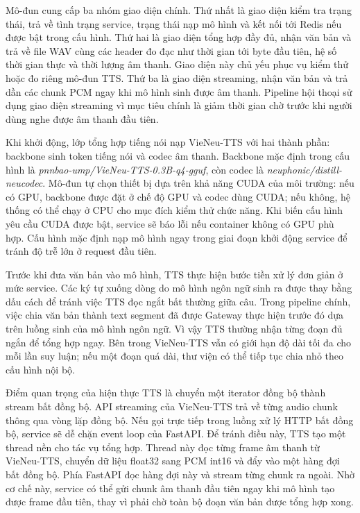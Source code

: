 \documentclass[a4paper,13pt,twoside]{report}
\begin{document}
Mô-đun cung cấp ba nhóm giao diện chính. Thứ nhất là giao diện kiểm tra trạng thái, trả về tình trạng service, trạng thái nạp mô hình và kết nối tới Redis nếu được bật trong cấu hình. Thứ hai là giao diện tổng hợp đầy đủ, nhận văn bản và trả về file WAV cùng các header đo đạc như thời gian tới byte đầu tiên, hệ số thời gian thực và thời lượng âm thanh. Giao diện này chủ yếu phục vụ kiểm thử hoặc đo riêng mô-đun TTS. Thứ ba là giao diện streaming, nhận văn bản và trả dần các chunk PCM ngay khi mô hình sinh được âm thanh. Pipeline hội thoại sử dụng giao diện streaming vì mục tiêu chính là giảm thời gian chờ trước khi người dùng nghe được âm thanh đầu tiên.

Khi khởi động, lớp tổng hợp tiếng nói nạp VieNeu-TTS với hai thành phần: backbone sinh token tiếng nói và codec âm thanh. Backbone mặc định trong cấu hình là \textit{pnnbao-ump/VieNeu-TTS-0.3B-q4-gguf}, còn codec là \textit{neuphonic/distill-neucodec}. Mô-đun tự chọn thiết bị dựa trên khả năng CUDA của môi trường: nếu có GPU, backbone được đặt ở chế độ GPU và codec dùng CUDA; nếu không, hệ thống có thể chạy ở CPU cho mục đích kiểm thử chức năng. Khi biến cấu hình yêu cầu CUDA được bật, service sẽ báo lỗi nếu container không có GPU phù hợp. Cấu hình mặc định nạp mô hình ngay trong giai đoạn khởi động service để tránh độ trễ lớn ở request đầu tiên.

Trước khi đưa văn bản vào mô hình, TTS thực hiện bước tiền xử lý đơn giản ở mức service. Các ký tự xuống dòng do mô hình ngôn ngữ sinh ra được thay bằng dấu cách để tránh việc TTS đọc ngắt bất thường giữa câu. Trong pipeline chính, việc chia văn bản thành text segment đã được Gateway thực hiện trước đó dựa trên luồng sinh của mô hình ngôn ngữ. Vì vậy TTS thường nhận từng đoạn đủ ngắn để tổng hợp ngay. Bên trong VieNeu-TTS vẫn có giới hạn độ dài tối đa cho mỗi lần suy luận; nếu một đoạn quá dài, thư viện có thể tiếp tục chia nhỏ theo cấu hình nội bộ.

Điểm quan trọng của hiện thực TTS là chuyển một iterator đồng bộ thành stream bất đồng bộ. API streaming của VieNeu-TTS trả về từng audio chunk thông qua vòng lặp đồng bộ. Nếu gọi trực tiếp trong luồng xử lý HTTP bất đồng bộ, service sẽ dễ chặn event loop của FastAPI. Để tránh điều này, TTS tạo một thread nền cho tác vụ tổng hợp. Thread này đọc từng frame âm thanh từ VieNeu-TTS, chuyển dữ liệu float32 sang PCM int16 và đẩy vào một hàng đợi bất đồng bộ. Phía FastAPI đọc hàng đợi này và stream từng chunk ra ngoài. Nhờ cơ chế này, service có thể gửi chunk âm thanh đầu tiên ngay khi mô hình tạo được frame đầu tiên, thay vì phải chờ toàn bộ đoạn văn bản được tổng hợp xong.
\end{document}
